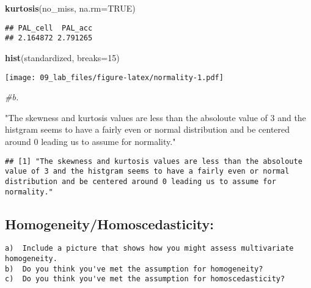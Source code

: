 \documentclass[
]{article}
\newenvironment{Shaded}{\begin{snugshade}}{\end{snugshade}}
\newcommand{\CommentTok}[1]{\textcolor[rgb]{0.56,0.35,0.01}{\textit{#1}}}
\newcommand{\DataTypeTok}[1]{\textcolor[rgb]{0.13,0.29,0.53}{#1}}
\newcommand{\DecValTok}[1]{\textcolor[rgb]{0.00,0.00,0.81}{#1}}
\newcommand{\KeywordTok}[1]{\textcolor[rgb]{0.13,0.29,0.53}{\textbf{#1}}}
\newcommand{\NormalTok}[1]{#1}
\newcommand{\OtherTok}[1]{\textcolor[rgb]{0.56,0.35,0.01}{#1}}
\newcommand{\StringTok}[1]{\textcolor[rgb]{0.31,0.60,0.02}{#1}}
\begin{document}
\begin{Shaded}
\begin{Highlighting}[]
\KeywordTok{kurtosis}\NormalTok{(no_miss, }\DataTypeTok{na.rm=}\OtherTok{TRUE}\NormalTok{)}
\end{Highlighting}
\end{Shaded}

\begin{verbatim}
## PAL_cell  PAL_acc 
## 2.164872 2.791265
\end{verbatim}

\begin{Shaded}
\begin{Highlighting}[]
\KeywordTok{hist}\NormalTok{(standardized, }\DataTypeTok{breaks=}\DecValTok{15}\NormalTok{)}
\end{Highlighting}
\end{Shaded}

\texttt{[image: 09\_lab\_files/figure-latex/normality-1.pdf]}

\begin{Shaded}
\begin{Highlighting}[]
\CommentTok{#b.}

\StringTok{"The skewness and kurtosis values are less than the absoloute value of 3 and the histgram seems to have a fairly even or normal distribution and be centered around 0 leading us to assume for normality."}
\end{Highlighting}
\end{Shaded}

\begin{verbatim}
## [1] "The skewness and kurtosis values are less than the absoloute value of 3 and the histgram seems to have a fairly even or normal distribution and be centered around 0 leading us to assume for normality."
\end{verbatim}

\hypertarget{homogeneityhomoscedasticity}{%
\subsection{Homogeneity/Homoscedasticity:}\label{homogeneityhomoscedasticity}}

\begin{verbatim}
a)  Include a picture that shows how you might assess multivariate homogeneity.
b)  Do you think you've met the assumption for homogeneity?
c)  Do you think you've met the assumption for homoscedasticity?
\end{verbatim}
\end{document}
